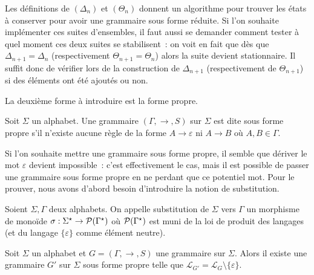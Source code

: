 \begin{remark}
  Les définitions de $(\Delta_n)$ et $(\Theta_n)$ donnent un algorithme pour
  trouver les états à conserver pour avoir une grammaire sous forme réduite. Si
  l'on souhaite implémenter ces suites d'ensembles, il faut aussi se demander
  comment tester à quel moment ces deux suites se stabilisent~: on voit en fait
  que dès que $\Delta_{n+1} = \Delta_n$ (respectivement $\Theta_{n+1}=\Theta_n$)
  alors la suite devient stationnaire. Il suffit donc de vérifier lors de la
  construction de $\Delta_{n+1}$ (respectivement de $\Theta_{n+1}$) si des
  éléments ont été ajoutés ou non.
\end{remark}

La deuxième forme à introduire est la forme propre.

\begin{definition}
  Soit $\Sigma$ un alphabet. Une grammaire $(\Gamma,\to,S)$ sur $\Sigma$ est
  dite sous forme propre s'il n'existe aucune règle de la forme
  $A \to \varepsilon$ ni $A \to B$ où $A,B\in \Gamma$.
\end{definition}

Si l'on souhaite mettre une grammaire sous forme propre, il semble que dériver
le mot $\varepsilon$ devient impossible~: c'est effectivement le cas, mais il
est possible de passer une grammaire sous forme propre en ne perdant que ce
potentiel mot. Pour le prouver, nous avons d'abord besoin d'introduire la notion
de substitution.

\begin{definition}[Substitution]
  Soient $\Sigma, \Gamma$ deux alphabets. On appelle substitution de $\Sigma$
  vers $\Gamma$ un morphisme de monoïde
  $\sigma : \Sigma^\star \to \mathcal{P} (\Gamma^\star)$ où $\mathcal{P}(\Gamma^\star)$
  est muni de la loi de produit des langages (et du langage $\{\varepsilon\}$
  comme élément neutre).
\end{definition}

\begin{proposition}
  Soit $\Sigma$ un alphabet et $G = (\Gamma,\to,S)$ une grammaire sur $\Sigma$.
  Alors il existe une grammaire $G'$ sur $\Sigma$ sous forme propre telle que
  $\mathcal L_{G'} = \mathcal L_G \setminus \{\varepsilon\}$.
\end{proposition}


